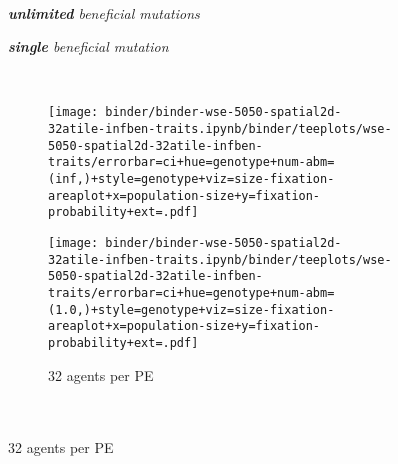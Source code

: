 \begin{figure}[h]
  \captionsetup[subfigure]{justification=raggedright}
  \begin{minipage}{0.7\textwidth}

    \begin{minipage}{0.04\textwidth}~\end{minipage}%
    \begin{minipage}{0.44\textwidth}
      \centering
      \itshape
      \textbf{unlimited} beneficial mutations
    \end{minipage}%
    \begin{minipage}{0.34\textwidth}
      \centering
      \itshape
      \textbf{single} beneficial mutation
    \end{minipage}

    ~\vspace{-1.5ex}

    \begin{subfigure}[b]{\linewidth}
      \begin{minipage}{0.88\textwidth}
        \begin{minipage}{0.53\textwidth}
          \texttt{[image: binder/binder-wse-5050-spatial2d-32atile-infben-traits.ipynb/binder/teeplots/wse-5050-spatial2d-32atile-infben-traits/errorbar=ci+hue=genotype+num-abm=(inf,)+style=genotype+viz=size-fixation-areaplot+x=population-size+y=fixation-probability+ext=.pdf]}%
        \end{minipage}%
        \begin{minipage}{0.47\textwidth}
          \texttt{[image: binder/binder-wse-5050-spatial2d-32atile-infben-traits.ipynb/binder/teeplots/wse-5050-spatial2d-32atile-infben-traits/errorbar=ci+hue=genotype+num-abm=(1.0,)+style=genotype+viz=size-fixation-areaplot+x=population-size+y=fixation-probability+ext=.pdf]}
        \end{minipage}
      \end{minipage}%
      \hspace{-3ex}%
      \begin{minipage}{0.12\textwidth}
        \raggedright
        \caption{\footnotesize 32 agents per PE\\~\\~\\}
        \label{fig:wse-inf-one:32}
      \end{minipage}%
    \end{subfigure}%


\end{minipage}
\end{figure}
